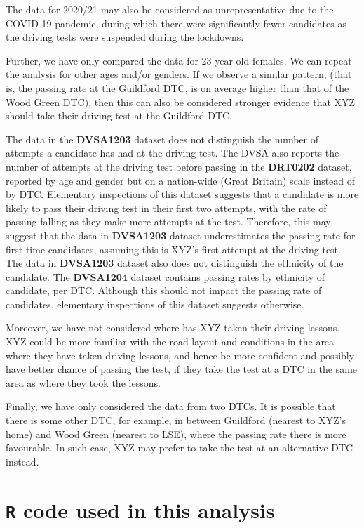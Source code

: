 \documentclass{article}
\begin{document}
The data for 2020/21 may also be considered as unrepresentative due to the COVID-19 pandemic, during which there were significantly fewer candidates as the driving tests were suspended during the lockdowns.

Further, we have only compared the data for 23 year old females. We can repeat the analysis for other ages and/or genders. If we observe a similar pattern, (that is, the passing rate at the Guildford DTC, is on average higher than that of the Wood Green DTC), then this can also be considered stronger evidence that XYZ should take their driving test at the Guildford DTC.

The data in the \textbf{DVSA1203} dataset does not distinguish the number of attempts a candidate has had at the driving test. The DVSA also reports the number of attempts at the driving test before passing in the \textbf{DRT0202} dataset, reported by age and gender but on a nation-wide (Great Britain) scale instead of by DTC. Elementary inspections of this dataset suggests that a candidate is more likely to pass their driving test in their first two attempts, with the rate of passing falling as they make more attempts at the test. Therefore, this may suggest that the data in \textbf{DVSA1203} dataset underestimates the passing rate for first-time candidates, assuming this is XYZ's first attempt at the driving test. The data in \textbf{DVSA1203} dataset also does not distinguish the ethnicity of the candidate. The \textbf{DVSA1204} dataset contains passing rates by ethnicity of candidate, per DTC. Although this should not impact the passing rate of candidates, elementary inspections of this dataset suggests otherwise. 

Moreover, we have not considered where has XYZ taken their driving lessons. XYZ could be more familiar with the road layout and conditions in the area where they have taken driving lessons, and hence be more confident and possibly have better chance of passing the test, if they take the test at a DTC in the same area as where they took the lessons. 

Finally, we have only considered the data from two DTCs. It is possible that there is some other DTC, for example, in between Guildford (nearest to XYZ's home) and Wood Green (nearest to LSE), where the passing rate there is more favourable. In such case, XYZ may prefer to take the test at an alternative DTC instead.

\pagebreak
\section*{\texttt{R} code used in this analysis}
\begin{singlespace}

\end{singlespace}
\end{document}
